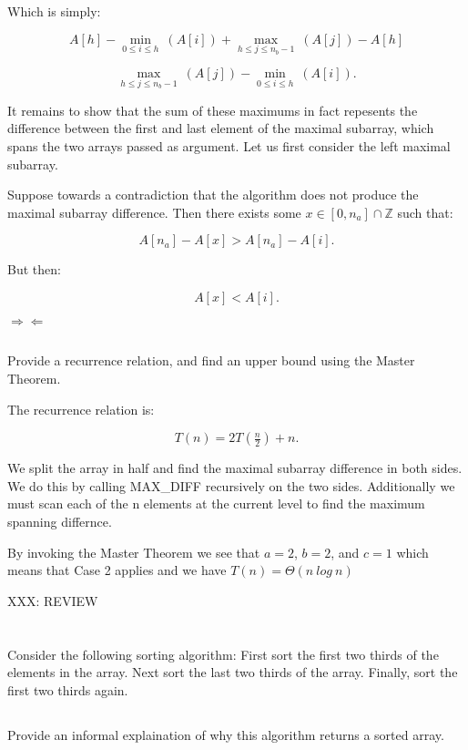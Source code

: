 \documentclass{amsart}
\theoremstyle{definition}
\theoremstyle{remark}
\numberwithin{equation}{section}
\newcommand{\ZZ}{\mathbb Z}
\begin{document}
Which is simply:

$$ A[h] - \min_{0 \leq i \leq h}\ ( A[i] ) + \max_{h \leq j \leq n_b -1}\ ( A[j] ) - A[h] $$

$$ \max_{h \leq j \leq n_b -1}\ ( A[j] ) - \min_{0 \leq i \leq h}\ ( A[i] ). $$

\proof 

It remains to show that the sum of these maximums in fact repesents the
difference between the first and last element of the maximal subarray,
which spans the two arrays passed as argument. Let us first consider the
left maximal subarray.

Suppose towards a contradiction that the algorithm does not produce the
maximal subarray difference. Then there exists some $x \in [0,n_a] \cap
\ZZ$ such that:

$$ A[n_a] - A[x] > A[n_a] - A[i]. $$

But then:

$$ A[x] < A[i]. $$

$\Rightarrow\Leftarrow$

\subsection{} Provide a recurrence relation, and find an upper bound
using the Master Theorem.

The recurrence relation is:

$$ T( n ) = 2T(\tfrac{n}{2}) + n. $$

We split the array in half and find the maximal subarray
difference in both sides. We do this by calling MAX\_DIFF recursively on
the two sides. Additionally we must scan each of the n elements at the current
level to find the maximum spanning differnce.

By invoking the Master Theorem we see that $a=2$, $b=2$, and $c=1$ which
means that Case 2 applies and we have $T( n ) = \Theta( n\ log\ n )$


XXX: REVIEW
\section{} Consider the following sorting algorithm: First sort the
first two thirds of the elements in the array. Next sort the last two
thirds of the array. Finally, sort the first two thirds again.

\subsection{} Provide an informal explaination of why this algorithm
returns a sorted array. \\
\end{document}
